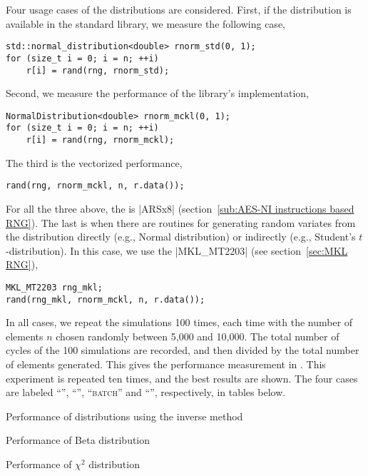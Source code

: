 Four usage cases of the distributions are considered. First, if the
distribution is available in the standard library, we measure the following
case,
\begin{verbatim}
std::normal_distribution<double> rnorm_std(0, 1);
for (size_t i = 0; i = n; ++i)
    r[i] = rand(rng, rnorm_std);
\end{verbatim}
Second, we measure the performance of the library's implementation,
\begin{verbatim}
NormalDistribution<double> rnorm_mckl(0, 1);
for (size_t i = 0; i = n; ++i)
    r[i] = rand(rng, rnorm_mckl);
\end{verbatim}
The third is the vectorized performance,
\begin{verbatim}
rand(rng, rnorm_mckl, n, r.data());
\end{verbatim}
For all the three above, the \rng is |ARSx8| (section~\ref{sub:AES-NI
instructions based RNG}). The last is when there are \mkl routines for
generating random variates from the distribution directly (e.g., Normal
distribution) or indirectly (e.g., Student's $t$-distribution). In this case,
we use the \rng |MKL_MT2203| (see section~\ref{sec:MKL RNG}),
\begin{verbatim}
MKL_MT2203 rng_mkl;
rand(rng_mkl, rnorm_mckl, n, r.data());
\end{verbatim}
In all cases, we repeat the simulations 100 times, each time with the number of
elements $n$ chosen randomly between 5,000 and 10,000. The total number of
cycles of the 100 simulations are recorded, and then divided by the total
number of elements generated. This gives the performance measurement in \cpe.
This experiment is repeated ten times, and the best results are shown. The four
cases are labeled ``\std'', ``\mckl'', ``\textsc{batch}'' and ``\mkl'',
respectively, in tables below.

\begin{table}
  \caption{Performance of distributions using the inverse method}
  \label{tab:Performance of distributions using the inverse method}
\end{table}

\begin{table}
  \caption{Performance of Beta distribution}
  \label{tab:Performance of Beta distribution}
\end{table}

\begin{table}
  \caption{Performance of $\chi^2$ distribution}
  \label{tab:Performance of chi-squared distribution}
\end{table}

